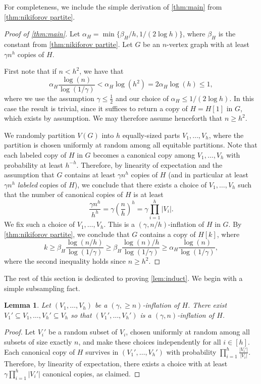 \documentclass{aic}
\theoremstyle{plain}
\newtheorem{lemma}[theorem]{Lemma}
\theoremstyle{remark}
\newcommand\ab[1]{\lvert #1 \rvert}
\begin{document}
For completeness, we include the simple derivation of \cref{thm:main} from \cref{thm:nikiforov partite}.
\begin{proof}[Proof of \cref{thm:main}]
    Let $\alpha_H = \min \{\beta_H/h, 1/(2\log h)\}$, where $\beta_H$ is the constant from \cref{thm:nikiforov partite}. Let $G$ be an $n$-vertex graph with at least $\gamma n^h$ copies of $H$.

    First note that if $n <h^2$, we have that
    \[
    \alpha_H \frac{\log(n)}{\log(1/\gamma)} < \alpha_H \log(h^2)= 2\alpha_H \log(h) \leq 1,
    \]
    where we use the assumption $\gamma \leq \frac 12$ and our choice of $\alpha_H \leq 1/(2\log h)$. In this case the result is trivial, since it suffices to return a copy of $H=H[1]$ in $G$, which exists by assumption. We may therefore assume henceforth that $n \geq h^2$.
    
    We randomly partition $V(G)$ into $h$ equally-sized parts $V_1,\dots,V_h$, where the partition is chosen uniformly at random among all equitable partitions. Note that each labeled copy of $H$ in $G$ becomes a canonical copy among $V_1,\dots,V_h$ with probability at least $h^{-h}$. Therefore, by linearity of expectation and the assumption that $G$ contains at least $\gamma n^h$ copies of $H$ (and in particular at least $\gamma n^h$ \emph{labeled} copies of $H$), we conclude that there exists a choice of $V_1,\dots,V_h$ such that the number of canonical copies of $H$ is at least
    \[
        \frac{\gamma n^h}{h^h} = \gamma \left( \frac nh \right)^h=\gamma \prod_{i=1}^h \ab{V_i}.
    \]
    We fix such a choice of $V_1,\dots,V_h$. This is a $(\gamma,n/h)$-inflation of $H$ in $G$. By \cref{thm:nikiforov partite}, we conclude that $G$ contains a copy of $H[k]$, where
    \[
    k \geq \beta_H \frac{\log(n/h)}{\log(1/\gamma)} \geq \beta_H \frac{\log(n)/h}{\log(1/\gamma)} \geq \alpha_H \frac{\log(n)}{\log(1/\gamma)},
    \]
    where the second inequality holds since $n \geq h^2$.
\end{proof}
The rest of this section is dedicated to proving \cref{lem:induct}. 
We begin with a simple subsampling fact.
\begin{lemma}\label{lem:subsample}
    Let $(V_1,\dots,V_h)$ be a $(\gamma, \geq n)$-inflation of $H$. There exist $V_1'\subseteq V_1,\dots,V_h'\subseteq V_h$ so that $(V_1',\dots,V_h')$ is a $(\gamma,n)$-inflation of $H$.
\end{lemma}
\begin{proof}
    Let $V_i'$ be a random subset of $V_i$, chosen uniformly at random among all subsets of size exactly $n$, and make these choices independently for all $i \in [h]$. Each canonical copy of $H$ survives in $(V_1',\dots,V_h')$ with probability $\prod_{i=1}^h \frac{\ab{V_i'}}{\ab{V_i}}$. Therefore, by linearity of expectation, there exists a choice with at least $\gamma \prod_{i=1}^h \ab{V_i'}$ canonical copies, as claimed.
\end{proof}
\end{document}
